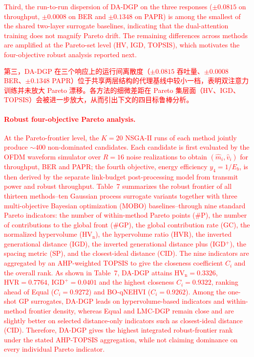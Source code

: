 \documentclass[11pt]{article}
\begin{document}
\textcolor{red}{Third, the run-to-run dispersion of DA-DGP on the three responses ($\pm 0.0815$ on throughput, $\pm 0.0008$ on BER and $\pm 0.1348$ on PAPR) is among the smallest of the shared two-layer surrogate baselines, indicating that the dual-attention training does not magnify Pareto drift. The remaining differences across methods are amplified at the Pareto-set level (HV, IGD, TOPSIS), which motivates the four-objective robust analysis reported next.}%

\textcolor{red}{第三，DA-DGP 在三个响应上的运行间离散度（$\pm 0.0815$ 吞吐量、$\pm 0.0008$ BER、$\pm 0.1348$ PAPR）位于共享两层结构的代理基线中较小一档，表明双注意力训练并未放大 Pareto 漂移。各方法的细微差距在 Pareto 集层面（HV、IGD、TOPSIS）会被进一步放大，从而引出下文的四目标鲁棒分析。}%

\textcolor{red}{\paragraph{Robust four-objective Pareto analysis.}}%
\textcolor{red}{At the Pareto-frontier level, the $K=20$ NSGA-II runs of each method jointly produce $\sim\!400$ non-dominated candidates. Each candidate is first evaluated by the OFDM waveform simulator over $R=16$ noise realizations to obtain $(\hat{m}_{i},\hat{v}_{i})$ for throughput, BER and PAPR; the fourth objective, energy efficiency $y_{4}=1/E_{b}$, is then derived by the separate link-budget post-processing model from transmit power and robust throughput.}%
\textcolor{red}{Table~7 summarizes the robust frontier of all thirteen methods--ten Gaussian process surrogate variants together with three multi-objective Bayesian optimization (MOBO) baselines--through nine standard Pareto indicators: the number of within-method Pareto points (\#P), the number of contributions to the global front (\#GP), the global contribution rate (GC), the normalized hypervolume ($\mathrm{HV}_{\mathrm{n}}$), the hypervolume ratio (HVR), the inverted generational distance (IGD), the inverted generational distance plus (IGD$^{+}$), the spacing metric (SP), and the closest-ideal distance (CID). The nine indicators are aggregated by an AHP-weighted TOPSIS to give the closeness coefficient $C_{i}$ and the overall rank.}%
\textcolor{red}{As shown in Table~7, DA-DGP attains $\mathrm{HV}_{\mathrm{n}}=0.3326$, $\mathrm{HVR}=0.7764$, $\mathrm{IGD}^{+}=0.0401$ and the highest closeness $C_{i}=0.9322$, ranking ahead of Equal ($C_{i}=0.9272$) and BO-qNEHVI ($C_{i}=0.9262$). Among the one-shot GP surrogates, DA-DGP leads on hypervolume-based indicators and within-method frontier density, whereas Equal and LMC-DGP remain close and are slightly better on selected distance-only indicators such as closest-ideal distance (CID). Therefore, DA-DGP gives the highest integrated robust-frontier rank under the stated AHP-TOPSIS aggregation, while not claiming dominance on every individual Pareto indicator.}%
\end{document}
